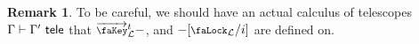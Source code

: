 \documentclass[10pt]{article} \usepackage{fullpage}
\theoremstyle{definition} \newtheorem{definition}[theorem]{Definition}
\newtheorem{remark}[theorem]{Remark}
\newcommand{\tele}{\,\,\mathsf{tele}}
\newcommand{\lock}{\mathchoice {\scalebox{0.8}{\text{\faLock}}}
  {\scalebox{0.8}{\text{\faLock}}} {\scalebox{0.5}{\text{\faLock}}}
  {\scalebox{0.4}{\text{\faLock}}} }
\newcommand{\admkeye}[2]{\overrightarrow{\key}_{#1}^{#2}}
\newcommand{\locksub}[2]{\lock_{\lockn{#1}}/#2}
\begin{document}
\begin{remark}
  To be careful, we should have an actual calculus of telescopes
  $\Gamma \yields \Gamma' \tele$ that $\admkeye{\lockn{L}}{t} -$,
  and $-[\locksub{L}{i}]$ are defined on.
\end{remark}

\end{document}
